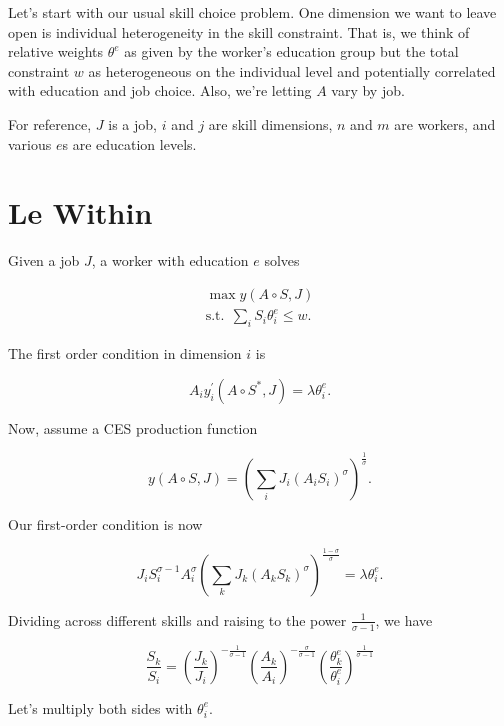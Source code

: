 \documentclass[12pt]{article}
\begin{document}
Let's start with our usual skill choice problem. 
One dimension we want to leave open is individual heterogeneity in the skill constraint. 
That is, we think of relative weights $\theta^e$ as given by the worker's education group but the total constraint $w$
as heterogeneous on the individual level and potentially correlated with education and job choice.
Also, we're letting $A$ vary by job.

For reference, $J$ is a job, $i$ and $j$ are skill dimensions, $n$ and $m$ are workers, and various $e$s are education levels.

\section{Le Within}

Given a job $J$, a worker with education $e$ solves

\begin{eqnarray}
\max y(A\circ S,J)\\
\text{s.t.} ~~ \sum_iS_i\theta_i^e\leq w.
\end{eqnarray}

The first order condition in dimension $i$ is

\begin{equation}
A_iy^\prime_i (A\circ S^*,J)= \lambda \theta^e_i.
\end{equation}


Now, assume a CES production function

\begin{equation}
y(A\circ S, J)=\left (\sum_i J_i(A_iS_i)^\sigma\right)^{\frac 1 \sigma}.
\end{equation}

Our first-order condition is now

\begin{equation}
J_iS_i^{\sigma-1}A_i^\sigma \left (\sum_k J_k(A_kS_k)^\sigma\right)^{\frac {1-\sigma} \sigma}=\lambda \theta^e_i.
\end{equation}

Dividing across different skills and raising to the power $\frac{1}{\sigma-1}$, we have

\begin{equation}
\frac{S_k}{S_i}=\left(\frac{J_k}{J_i}\right)^{-\frac 1 {\sigma-1}} \left(\frac{A_k}{A_i}\right)^{-\frac \sigma {\sigma-1}} \left(\frac{\theta_k^e}{\theta_i^e}\right)^{\frac 1 {\sigma-1}}
\end{equation}

Let's multiply both sides with $\theta_i^e$.
\end{document}
